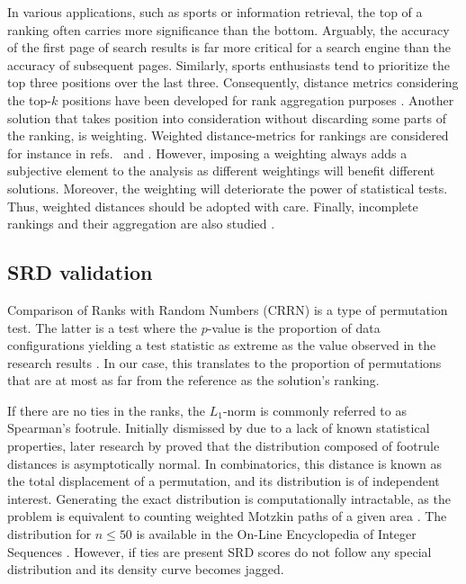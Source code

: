 In various applications, such as sports or information retrieval, the top of a ranking often carries more significance than the bottom. Arguably, the accuracy of the first page of search results is far more critical for a search engine than the accuracy of subsequent pages. Similarly, sports enthusiasts tend to prioritize the top three positions over the last three. Consequently, distance metrics considering the top-$k$ positions have been developed for rank aggregation purposes \citep{Fagin2003}. Another solution that takes position into consideration without discarding some parts of the ranking, is weighting. Weighted distance-metrics for rankings are considered for instance in refs.\ \citep{Gere2022,CHATTERJEE201847} and \citep{sziklai2022efficacy}. However, imposing a weighting always adds a subjective element to the analysis as different weightings will benefit different solutions. Moreover, the weighting will deteriorate the power of statistical tests. Thus, weighted distances should be adopted with care. Finally, incomplete rankings and their aggregation are also studied \citep{RODRIGO2024111882}.

\subsection{SRD validation}\label{sec:lit_distrib}

Comparison of Ranks with Random Numbers (CRRN) is a type of permutation test. The latter is a test where the $p$-value is the proportion of data configurations yielding a test statistic as extreme as the value observed in the research results \citep{edgington2007randomization}. In our case, this translates to the proportion of permutations that are at most as far from the reference as the solution's ranking. %

If there are no ties in the ranks, the $L_1$-norm is commonly referred to as  Spearman's footrule. Initially dismissed by \cite{kendall1970rank} due to a lack of known statistical properties, later research by \cite{Diaconis_Graham_1977} proved that the distribution composed of footrule distances is asymptotically normal. In combinatorics, this distance is known as the total displacement of a permutation, and its distribution is of independent interest. Generating the exact distribution is computationally intractable, as the problem is equivalent to counting weighted Motzkin paths of a given area \citep{Guay_Paquet_2014}. The distribution for $n \leq 50$ is available in the On-Line Encyclopedia of Integer Sequences \citep{oeis2024}. However, if ties are present SRD scores do not follow any special distribution and its density curve becomes jagged.

